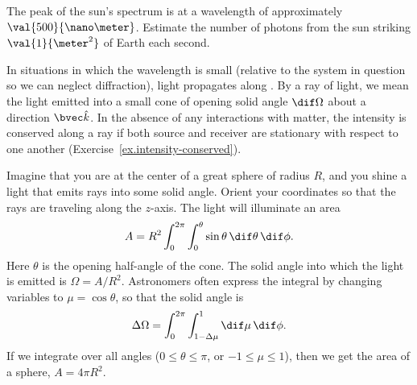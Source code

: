 \begin{exercisebox}
The peak of the sun's spectrum is at a wavelength of approximately $\val{500}{\nano\meter}$. Estimate the number of photons from the sun striking $\val{1}{\meter^{2}}$ of Earth each second.
\end{exercisebox}

In situations in which the wavelength is small (relative to the system in question so we can neglect diffraction), light propagates along . By a ray of light, we mean the light emitted into a small cone of opening solid angle $\dif\Omega$ about a direction $\unitk$. In the absence of any interactions with matter, the intensity is conserved along a ray if both source and receiver are stationary with respect to one another (Exercise~\ref{ex.intensity-conserved}).

\begin{sidebar}
\label{sb.solid-angles}
Imagine that you are at the center of a great sphere of radius $R$, and you shine a light that emits rays into some solid angle. Orient your coordinates so that the rays are traveling along the $z$-axis. The light will illuminate an area
\[ 	A = R^{2}\int_{0}^{2\pi}\int_{0}^{\theta}\sin\theta\,\dif\theta\,\dif\phi. \]
Here $\theta$ is the opening half-angle of the cone. The solid angle into which the light is emitted is $\Omega = A/R^{2}$. Astronomers often express the integral by changing variables to $\mu = \cos\theta$, so that the solid angle is
\[
	\Delta\Omega = \int_{0}^{2\pi}\int_{1-\Delta\mu}^{1}\dif\mu\,\dif\phi.
\]
If we integrate over all angles ($0\le\theta\le\pi$, or $-1\le\mu\le 1$), then we get the area of a sphere, $A = 4\pi R^{2}$.
\end{sidebar}

